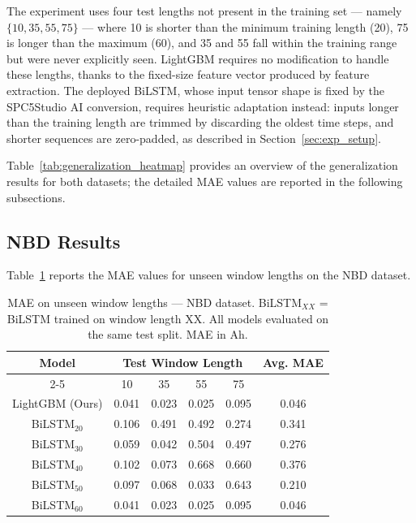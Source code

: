 The experiment uses four test lengths not present in the training set --- namely $\{10, 35, 55, 75\}$ --- where 10 is shorter than the minimum training length (20), 75 is longer than the maximum (60), and 35 and 55 fall within the training range but were never explicitly seen. LightGBM requires no modification to handle these lengths, thanks to the fixed-size feature vector produced by feature extraction. The deployed BiLSTM, whose input tensor shape is fixed by the SPC5Studio AI conversion, requires heuristic adaptation instead: inputs longer than the training length are trimmed by discarding the oldest time steps, and shorter sequences are zero-padded, as described in Section~\ref{sec:exp_setup}.

Table~\ref{tab:generalization_heatmap} provides an overview of the generalization results for both datasets; the detailed MAE values are reported in the following subsections.



\subsection{NBD Results}

Table~\ref{tab:generalization_nbd} reports the MAE values for unseen window lengths on the NBD dataset.

\begin{table}[H]
    \centering
    \setcellgapes{3pt}
    \makegapedcells
    \begin{tabular}{c c c c c c}
    \hline
    \multirow{2}{*}{Model} & \multicolumn{4}{c}{Test Window Length} & \multirow{2}{*}{Avg. MAE} \\
    \cline{2-5}
    & 10 & 35 & 55 & 75 & \\
    \hline
    LightGBM (Ours) & 0.041 & 0.023 & 0.025 & 0.095 & 0.046 \\
    BiLSTM$_{20}$ & 0.106 & 0.491 & 0.492 & 0.274 & 0.341 \\
    BiLSTM$_{30}$ & 0.059 & 0.042 & 0.504 & 0.497 & 0.276 \\
    BiLSTM$_{40}$ & 0.102 & 0.073 & 0.668 & 0.660 & 0.376 \\
    BiLSTM$_{50}$ & 0.097 & 0.068 & 0.033 & 0.643 & 0.210 \\
    BiLSTM$_{60}$ & 0.041 & 0.023 & 0.025 & 0.095 & 0.046 \\
    \hline
    \end{tabular}
    \caption{MAE on unseen window lengths  ---  NBD dataset. BiLSTM$_{XX}$ = BiLSTM trained on window length XX. All models evaluated on the same test split. MAE in Ah.}
    \label{tab:generalization_nbd}
\end{table}

